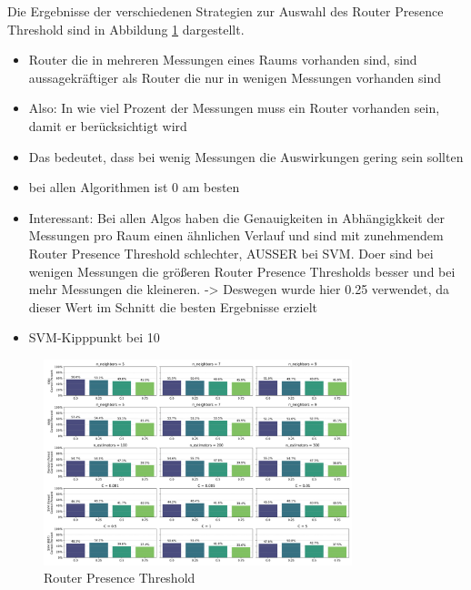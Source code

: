 Die Ergebnisse der verschiedenen Strategien zur Auswahl des Router Presence Threshold sind in Abbildung \ref{fig:5_router_presence_threshold_01} dargestellt.

\begin{itemize}
    \item Router die in mehreren Messungen eines Raums vorhanden sind, sind aussagekräftiger als Router die nur in wenigen Messungen vorhanden sind
    \item Also: In wie viel Prozent der Messungen muss ein Router vorhanden sein, damit er berücksichtigt wird
    \item Das bedeutet, dass bei wenig Messungen die Auswirkungen gering sein sollten
\end{itemize}    

\begin{itemize}
    \item bei allen Algorithmen ist 0 am besten
    \item Interessant: Bei allen Algos haben die Genauigkeiten in Abhängigkkeit der Messungen pro Raum einen ähnlichen Verlauf und sind mit zunehmendem Router Presence Threshold schlechter, AUSSER bei SVM. Doer sind bei wenigen Messungen die größeren Router Presence Thresholds besser und bei mehr Messungen die kleineren. -> Deswegen wurde hier 0.25 verwendet, da dieser Wert im Schnitt die besten Ergebnisse erzielt
    \item SVM-Kipppunkt bei 10
\end{itemize}

\begin{figure}[H]
    \centering
    \includegraphics[width=0.8\textwidth]{images/5_router_presence_threshold_01.png}
    \caption{Router Presence Threshold}
    \label{fig:5_router_presence_threshold_01}
\end{figure}

